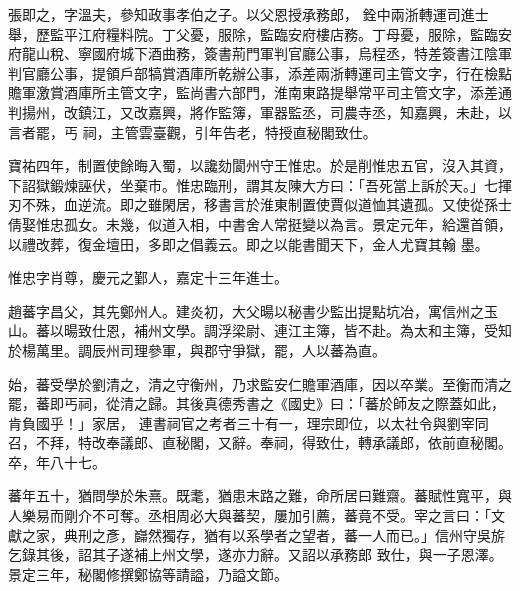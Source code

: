 \begin{pinyinscope}
 張即之，字溫夫，參知政事孝伯之子。以父恩授承務郎，
 銓中兩浙轉運司進士舉，歷監平江府糧料院。丁父憂，服除，監臨安府樓店務。丁母憂，服除，監臨安府龍山稅、寧國府城下酒曲務，簽書荊門軍判官廳公事，烏程丞，特差簽書江陰軍判官廳公事，提領戶部犒賞酒庫所乾辦公事，添差兩浙轉運司主管文字，行在檢點贍軍激賞酒庫所主管文字，監尚書六部門，淮南東路提舉常平司主管文字，添差通判揚州，改鎮江，又改嘉興，將作監簿，軍器監丞，司農寺丞，知嘉興，未赴，以言者罷，丐
 祠，主管雲臺觀，引年告老，特授直秘閣致仕。



 寶祐四年，制置使餘晦入蜀，以讒劾閬州守王惟忠。於是削惟忠五官，沒入其資，下詔獄鍛煉誣伏，坐棄市。惟忠臨刑，謂其友陳大方曰：「吾死當上訴於天。」七揮刃不殊，血逆流。即之雖閑居，移書言於淮東制置使賈似道恤其遺孤。又使從孫士倩娶惟忠孤女。未幾，似道入相，中書舍人常挺變以為言。景定元年，給還首領，以禮改葬，復金壇田，多即之倡義云。即之以能書聞天下，金人尤寶其翰
 墨。



 惟忠字肖尊，慶元之鄞人，嘉定十三年進士。



 趙蕃字昌父，其先鄭州人。建炎初，大父暘以秘書少監出提點坑冶，寓信州之玉山。蕃以暘致仕恩，補州文學。調浮梁尉、連江主簿，皆不赴。為太和主簿，受知於楊萬里。調辰州司理參軍，與郡守爭獄，罷，人以蕃為直。



 始，蕃受學於劉清之，清之守衡州，乃求監安仁贍軍酒庫，因以卒業。至衡而清之罷，蕃即丐祠，從清之歸。其後真德秀書之《國史》曰：「蕃於師友之際蓋如此，肯負國乎！」家居，
 連書祠官之考者三十有一，理宗即位，以太社令與劉宰同召，不拜，特改奉議郎、直秘閣，又辭。奉祠，得致仕，轉承議郎，依前直秘閣。卒，年八十七。



 蕃年五十，猶問學於朱熹。既耄，猶患末路之難，命所居曰難齋。蕃賦性寬平，與人樂易而剛介不可奪。丞相周必大與蕃契，屢加引薦，蕃竟不受。宰之言曰：「文獻之家，典刑之彥，巋然獨存，猶有以系學者之望者，蕃一人而已。」信州守吳旂乞錄其後，詔其子遂補上州文學，遂亦力辭。又詔以承務郎
 致仕，與一子恩澤。景定三年，秘閣修撰鄭協等請謚，乃謚文節。



\end{pinyinscope}